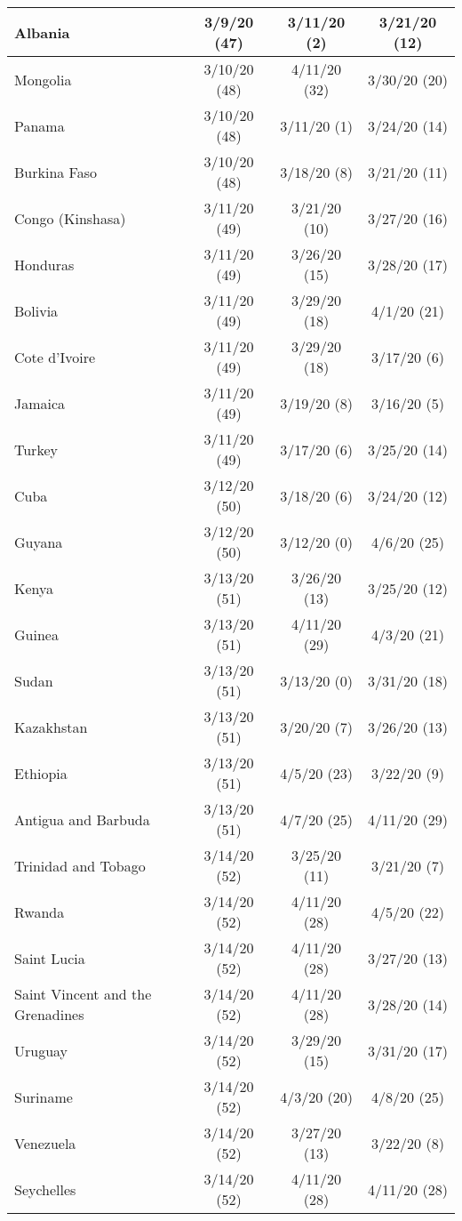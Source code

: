 \begin{table}[h]
\begin{longtable}{p{} c c c}
Albania & 3/9/20 (47)  & 3/11/20 (2)  & 3/21/20 (12) \\
\hline 
Mongolia & 3/10/20 (48)  & 4/11/20 (32)  & 3/30/20 (20) \\
Panama & 3/10/20 (48)  & 3/11/20 (1)  & 3/24/20 (14) \\
Burkina Faso & 3/10/20 (48)  & 3/18/20 (8)  & 3/21/20 (11) \\
\hline 
Congo (Kinshasa) & 3/11/20 (49)  & 3/21/20 (10)  & 3/27/20 (16) \\
Honduras & 3/11/20 (49)  & 3/26/20 (15)  & 3/28/20 (17) \\
Bolivia & 3/11/20 (49)  & 3/29/20 (18)  & 4/1/20 (21) \\
Cote d'Ivoire & 3/11/20 (49)  & 3/29/20 (18)  & 3/17/20 (6) \\
Jamaica & 3/11/20 (49)  & 3/19/20 (8)  & 3/16/20 (5) \\
Turkey & 3/11/20 (49)  & 3/17/20 (6)  & 3/25/20 (14) \\
\hline 
Cuba & 3/12/20 (50)  & 3/18/20 (6)  & 3/24/20 (12) \\
Guyana & 3/12/20 (50)  & 3/12/20 (0)  & 4/6/20 (25) \\
\hline 
Kenya & 3/13/20 (51)  & 3/26/20 (13)  & 3/25/20 (12) \\
Guinea & 3/13/20 (51)  & 4/11/20 (29)  & 4/3/20 (21) \\
Sudan & 3/13/20 (51)  & 3/13/20 (0)  & 3/31/20 (18) \\
Kazakhstan & 3/13/20 (51)  & 3/20/20 (7)  & 3/26/20 (13) \\
Ethiopia & 3/13/20 (51)  & 4/5/20 (23)  & 3/22/20 (9) \\
Antigua and Barbuda & 3/13/20 (51)  & 4/7/20 (25)  & 4/11/20 (29) \\
\hline 
Trinidad and Tobago & 3/14/20 (52)  & 3/25/20 (11)  & 3/21/20 (7) \\
Rwanda & 3/14/20 (52)  & 4/11/20 (28)  & 4/5/20 (22) \\
Saint Lucia & 3/14/20 (52)  & 4/11/20 (28)  & 3/27/20 (13) \\
Saint Vincent and the Grenadines & 3/14/20 (52)  & 4/11/20 (28)  & 3/28/20 (14) \\
Uruguay & 3/14/20 (52)  & 3/29/20 (15)  & 3/31/20 (17) \\
Suriname & 3/14/20 (52)  & 4/3/20 (20)  & 4/8/20 (25) \\
Venezuela & 3/14/20 (52)  & 3/27/20 (13)  & 3/22/20 (8) \\
Seychelles & 3/14/20 (52)  & 4/11/20 (28)  & 4/11/20 (28) \\

\end{longtable}
\end{table}
